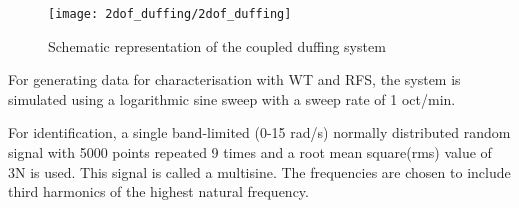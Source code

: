 \begin{figure}[!ht]
  \centering
  \texttt{[image: 2dof\_duffing/2dof\_duffing]}
  \caption{Schematic representation of the coupled duffing system}
  \label{fig:duf_schematic}
\end{figure}

For generating data for characterisation with WT and RFS, the system is
simulated using a logarithmic sine sweep with a sweep rate of 1 oct/min.

For identification, a single band-limited (0-15 rad/s) normally distributed
random signal with 5000 points repeated 9 times and a root mean square(rms)
value of 3N is used. This signal is called a multisine. The frequencies are
chosen to include third harmonics of the highest natural frequency.


